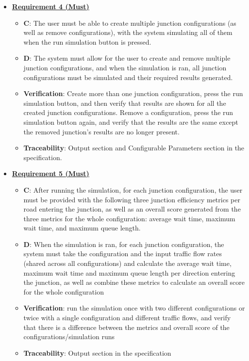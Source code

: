 \documentclass{article}
\begin{document}
\begin{itemize}
    \item \textbf{\underline{Requirement 4 (Must)}}
    \begin{itemize}
        \item \textbf{C}: The user must be able to create multiple junction configurations (as 
        well as remove configurations), with the system simulating all of them when the run 
        simulation button is pressed.
        \item \textbf{D}: The system must allow for the user to create and remove multiple 
        junction configurations, and when the simulation is ran, all junction configurations 
        must be simulated and their required results generated.
        \item \textbf{Verification}: Create more than one junction configuration, press the run 
        simulation button, and then verify that results are shown for all the created junction 
        configurations. Remove a configuration, press the run simulation button again, and verify 
        that the results are the same except the removed junction's results are no longer present.
        \item\textbf{Traceability}: Output section and Configurable Parameters section in the specification.
    \end{itemize}

    \item \textbf{\underline{Requirement 5 (Must)}}
    \begin{itemize}
        \item \textbf{C}: After running the simulation, for each junction configuration, 
            the user must be provided with the following three junction efficiency metrics 
            per road entering the junction, as well as an overall score generated from the 
            three metrics for the whole configuration: average wait time, maximum wait time, 
            and maximum queue length.
        \item \textbf{D}: When the simulation is ran, for each junction configuration, the system 
            must take the configuration and the input traffic flow rates (shared across all 
            configurations) and calculate the average wait time, maximum wait time and 
            maximum queue length per direction entering the junction, as well as combine 
            these metrics to calculate an overall score for the whole configuration
        \item \textbf{Verification}: run the simulation once with two different configurations 
            or twice with a single configuration and different traffic flows, and verify 
            that there is a difference between the metrics and overall score of the 
            configurations/simulation runs
        \item\textbf{Traceability}: Output section in the specification
    \end{itemize}


\end{itemize}
\end{document}
